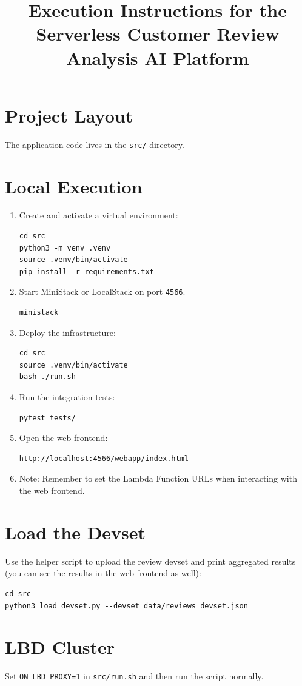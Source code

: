 \documentclass[11pt]{article}
\title{Execution Instructions for the Serverless Customer Review Analysis AI Platform}
\author{}
\date{}
\begin{document}
\maketitle

\section*{Project Layout}
The application code lives in the \texttt{src/} directory.

\section*{Local Execution}
\begin{enumerate}
  \item Create and activate a virtual environment:
  \begin{verbatim}
cd src
python3 -m venv .venv
source .venv/bin/activate
pip install -r requirements.txt
  \end{verbatim}

  \item Start MiniStack or LocalStack on port \texttt{4566}.
  \begin{verbatim}
ministack
  \end{verbatim}

  \item Deploy the infrastructure:
  \begin{verbatim}
cd src
source .venv/bin/activate
bash ./run.sh
  \end{verbatim}

  \item Run the integration tests:
  \begin{verbatim}
pytest tests/
  \end{verbatim}

  \item Open the web frontend:
  \begin{verbatim}
http://localhost:4566/webapp/index.html
  \end{verbatim}

  \item Note: Remember to set the Lambda Function URLs when interacting with the web frontend.
\end{enumerate}

\section*{Load the Devset}
Use the helper script to upload the review devset and print aggregated results (you can see the results in the web frontend as well):
\begin{verbatim}
cd src
python3 load_devset.py --devset data/reviews_devset.json
  \end{verbatim}

\section*{LBD Cluster}
Set \texttt{ON\_LBD\_PROXY=1} in \texttt{src/run.sh} and then run the script normally.
\end{document}
